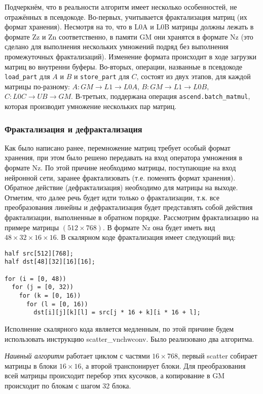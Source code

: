 Подчеркнём, что в реальности алгоритм имеет несколько особенностей, не
отражённых в псевдокоде. Во-первых, учитывается фрактализация матриц (их формат
хранения). Несмотря на то, что в L0A и L0B матрицы должны лежать в формате Zz и Zn
соответственно, в памяти GM они хранятся в формате Nz (это сделано для выполнения
нескольких умножений подряд без выполнения промежуточных фрактализаций). Изменение
формата происходит в ходе загрузки матриц во внутренни буферы. Во-вторых,
операции, названные в псевдокоде \texttt{load\_part} для $A$ и $B$ и \texttt{store\_part}
для $C$, состоят из двух этапов, для каждой матрицы по-разному:
$A: GM \rightarrow L1 \rightarrow L0A$, $B: GM \rightarrow L1 \rightarrow L0B$,
$C: L0C \rightarrow UB \rightarrow GM$. В-третьих, поддержана операция
\texttt{ascend.batch\_matmul}, которая производит умножение нескольких пар матриц.

\subsubsection{Фрактализация и дефрактализация}

Как было написано ранее, перемножение матриц требует особый формат хранения,
при этом было решено передавать на вход оператора умножения в формате Nz.
По этой причине необходимо матрицы, поступающие на вход нейронной сети, заранее
фрактализовать (т.е. поменять формат хранения). Обратное действие
(дефрактализация) необходимо для матрицы на выходе. Отметим, что далее речь
будет идти только о фрактализации, т.к. все преобразования линейны и
дефрактализация будет представлять собой действия фрактализации, выполненные в
обратном порядке. Рассмотрим фрактализацию на примере матрицы
$(512 \times 768)$. В формате Nz она будет иметь вид
$48 \times 32 \times 16 \times 16$. В скалярном коде фрактализация имеет
следующий вид:

\begin{lstlisting}
half src[512][768];
half dst[48][32][16][16];

for (i = [0, 48))
  for (j = [0, 32))
    for (k = [0, 16))
      for (l = [0, 16))
        dst[i][j][k][l] = src[j * 16 + k][i * 16 + l];
\end{lstlisting}

Исполнение скалярного кода является медленным, по этой причине будем
использовать инструкцию scatter\_vnchwconv. Было реализовано два алгоритма.

\textit{Наивный алгоритм} работает циклом с частями $16 \times 768$, первый
scatter собирает матрицы в блоки $16 \times 16$, а второй транспонирует
блоки. Для преобразования всей матрицы происходит перебор этих кусочков,
а копирование в GM происходит по блокам с шагом 32 блока.

